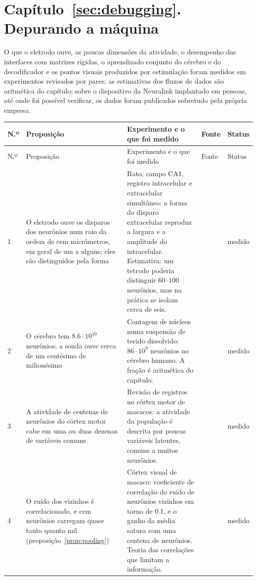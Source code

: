 \section{Capítulo~\ref{sec:debugging}. Depurando a máquina}

O que o eletrodo ouve, as poucas dimensões da atividade, o desempenho das interfaces com matrizes rígidas, o aprendizado conjunto do cérebro e do decodificador e os pontos visuais produzidos por estimulação foram medidos em experimentos revisados por pares; as estimativas dos fluxos de dados são aritmética do capítulo; sobre o dispositivo da Neuralink implantado em pessoas, até onde foi possível verificar, os dados foram publicados sobretudo pela própria empresa.

{\footnotesize
\setlength{\tabcolsep}{3pt}\renewcommand{\arraystretch}{1.15}
\begin{longtable}{>{\raggedright}p{0.5cm}>{\raggedright}p{4.0cm}>{\raggedright}p{5.6cm}>{\raggedright}p{2.3cm}>{\raggedright\arraybackslash}p{1.7cm}}
\toprule
N.º & Proposição & Experimento e o que foi medido & Fonte & Status \\
\midrule\endfirsthead
\toprule
N.º & Proposição & Experimento e o que foi medido & Fonte & Status \\
\midrule\endhead
1 & O eletrodo ouve os disparos dos neurônios num raio da ordem de cem micrômetros, em geral de um a alguns; eles são distinguidos pela forma & Rato, campo CA1, registro intracelular e extracelular simultâneo: a forma do disparo extracelular reproduz a largura e a amplitude do intracelular. Estimativa: um tetrodo poderia distinguir $60$--$100$ neurônios, mas na prática se isolam cerca de seis. & \cite{Henze2000extra} & medido \\
2 & O cérebro tem $8.6\cdot10^{10}$ neurônios; a sonda ouve cerca de um centésimo de milionésimo & Contagem de núcleos numa suspensão de tecido dissolvido: $86\cdot10^9$ neurônios no cérebro humano. A fração é aritmética do capítulo. & \cite{Azevedo2009} & medido \\
3 & A atividade de centenas de neurônios do córtex motor cabe em uma ou duas dezenas de variáveis comuns & Revisão de registros no córtex motor de macacos: a atividade da população é descrita por poucas variáveis latentes, comuns a muitos neurônios. & \cite{Gallego2017} & medido \\
4 & O ruído dos vizinhos é correlacionado, e cem neurônios carregam quase tanto quanto mil (proposição~\ref{prop:pooling}) & Córtex visual de macaco: coeficiente de correlação do ruído de neurônios vizinhos em torno de $0.1$, e o ganho da média satura com uma centena de neurônios. Teoria das correlações que limitam a informação. & \cite{Zohary1994, MorenoBote2014} & medido \\

\end{longtable}}
